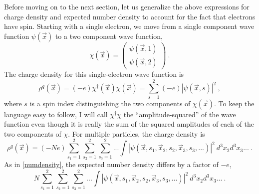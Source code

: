 \documentclass[onecolumn,secnumarabic,amsmath,amssymb,balancelastpage,nofootinbib]{article}
\begin{document}
Before moving on to the next section, let us generalize the above expressions for charge density and expected number density to account for the fact that electrons have spin.  Starting with a single electron, we move from a single component wave function $\psi(\vec{x})$ to a two component wave function,
\begin{equation}
\chi(\vec{x})=\left(
\begin{matrix}
\psi(\vec{x},1) \\
\psi(\vec{x},2)
\end{matrix}
\right)
\ .
\end{equation}
The charge density for this single-electron wave function is
\begin{equation}
\rho^q(\vec{x})=(- e) \chi^{\dagger}(\vec{x})\chi(\vec{x}) =\sum_{s=1}^{2}(- e) |\psi(\vec{x},s)|^2
\ ,
\label{chargedensitypauli}
\end{equation}
where $s$ is a spin index distinguishing the two components of $\chi(\vec{x})$.  To keep the language easy to follow, I will call $\chi^{\dagger}\chi$ the ``amplitude-squared'' of the wave function even though it is really the sum of the squared amplitudes of each of the two components of $\chi$.  For multiple particles, the charge density is
\begin{equation}
\rho^q(\vec{x})=(-N e) \sum_{s_1=1}^{2}\sum_{s_2=1}^{2}\sum_{s_3=1}^{2}...\int{|\psi(\vec{x},s_1,\vec{x}_2,s_2,\vec{x}_3,s_3,...)|^2\ d^3 x_2 d^3 x_3 ...}
\ .
\label{totalchargedensitypauli}
\end{equation}
As in \eqref{numdensity}, the expected number density differs by a factor of $-e$,
\begin{equation}
N \sum_{s_1=1}^{2}\sum_{s_2=1}^{2}\sum_{s_3=1}^{2}...\int{|\psi(\vec{x},s_1,\vec{x}_2,s_2,\vec{x}_3,s_3,...)|^2\ d^3 x_2 d^3 x_3 ...}
\ .
\label{numdensitypauli}
\end{equation}
\end{document}
